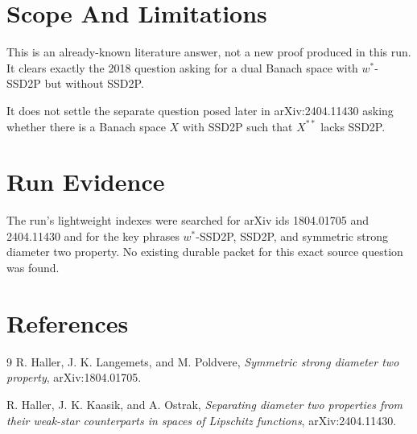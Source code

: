 \documentclass[11pt]{article}
\begin{document}
\section*{Scope And Limitations}

This is an already-known literature answer, not a new proof produced in this
run. It clears exactly the 2018 question asking for a dual Banach space with
\(w^\ast\)-SSD2P but without SSD2P.

It does not settle the separate question posed later in arXiv:2404.11430 asking
whether there is a Banach space \(X\) with SSD2P such that \(X^{**}\) lacks
SSD2P.

\section*{Run Evidence}

The run's lightweight indexes were searched for arXiv ids 1804.01705 and
2404.11430 and for the key phrases \(w^\ast\)-SSD2P, SSD2P, and symmetric
strong diameter two property. No existing durable packet for this exact source
question was found.

\section*{References}

\begin{thebibliography}{9}
R. Haller, J. K. Langemets, and M. Poldvere,
\emph{Symmetric strong diameter two property}, arXiv:1804.01705.

R. Haller, J. K. Kaasik, and A. Ostrak,
\emph{Separating diameter two properties from their weak-star counterparts in
spaces of Lipschitz functions}, arXiv:2404.11430.
\end{thebibliography}
\end{document}
